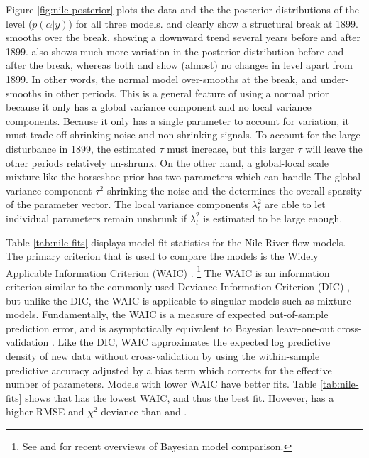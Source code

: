 \documentclass{article}
\begin{document}
Figure \ref{fig:nile-posterior} plots the data and the the posterior distributions of the level ($p(\alpha | y)$) for all three models.
 and  clearly show a structural break at 1899.
 smooths over the break, showing a downward trend several years before and after 1899.
 also shows much more variation in the posterior distribution before and after the break, whereas both  and  show (almost) no changes in level apart from 1899.
In other words, the normal model over-smooths at the break, and under-smooths in other periods.
This is a general feature of using a normal prior because it only has a global variance component and no local variance components.
Because it only has a single parameter to account for variation, it must trade off shrinking noise and non-shrinking signals.
To account for the large disturbance in 1899, the estimated $\tau$ must increase, but this larger $\tau$ will leave the other periods relatively un-shrunk.
On the other hand, a global-local scale mixture like the horseshoe prior has two parameters which can handle
The global variance component $\tau^{2}$ shrinking the noise and the determines the overall sparsity of the parameter vector.
The local variance components $\lambda^{2}_{t}$ are able to let individual parameters remain unshrunk if $\lambda_{t}^{2}$ is estimated to be large enough.

Table \ref{tab:nile-fits} displays model fit statistics for the Nile River flow models.
The primary criterion that is used to compare the models is the Widely Applicable Information Criterion (WAIC) \parencite{Watanabe2010}.%
\footnote{See \textcite{GelmanHwangVehtari2013} and \textcite{VehtariOjanen2012} for recent overviews of Bayesian model comparison.}
The WAIC is an information criterion similar to the commonly used Deviance Information Criterion (DIC) \parencite{spiegelhalter2002bayes}, but unlike the DIC, the WAIC is applicable to singular models such as mixture models.
Fundamentally, the WAIC is a measure of expected out-of-sample prediction error, and is asymptotically equivalent to Bayesian leave-one-out cross-validation \parencite{Watanabe2010}.
Like the DIC, WAIC approximates the expected log predictive density of new data without cross-validation by using the within-sample predictive accuracy adjusted by a bias term which corrects for the effective number of parameters.
Models with lower WAIC have better fits.
Table \ref{tab:nile-fits} shows that  has the lowest WAIC, and thus the best fit.
However,  has a higher RMSE and $\chi^{2}$ deviance than  and .
\end{document}
